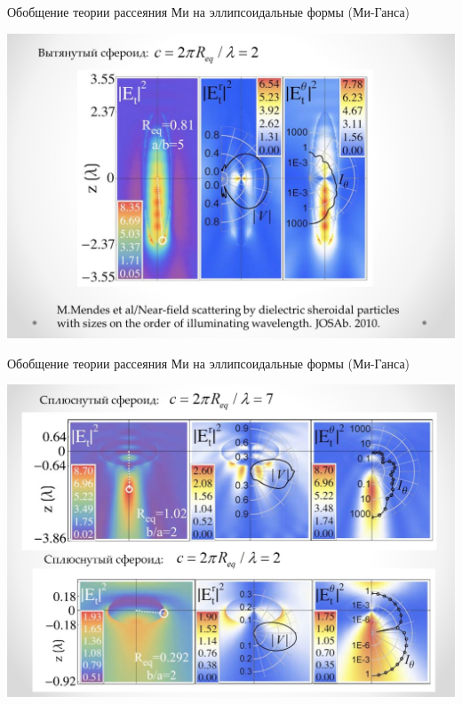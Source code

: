 \documentclass[9pt, compress, xcolor=table]{beamer}
\begin{document}
\begin{frame}{Обобщение теории рассеяния Ми на эллипсоидальные формы (Ми-Ганса)}
    
\begin{center}
\includegraphics[width=1.1\textwidth]{add_sl2}
\end{center}
\end{frame}

\begin{frame}{Обобщение теории рассеяния Ми на эллипсоидальные формы (Ми-Ганса)}

\begin{center}
\includegraphics[width=1.1\textwidth]{add_sl3}
\end{center}
    
\end{frame}
\end{document}
